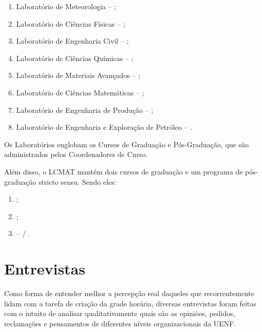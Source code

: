 \begin{enumerate}
  \item Laboratório de Meteorologia – ;
  \item Laboratório de Ciências Físicas – ;
  \item Laboratório de Engenharia Civil – ;
  \item Laboratório de Ciências Químicas – ;
  \item Laboratório de Materiais Avançados – ;
  \item Laboratório de Ciências Matemáticas – ;
  \item Laboratório de Engenharia de Produção – ;
  \item Laboratório de Engenharia e Exploração de Petróleo – .
\end{enumerate}

Os Laboratórios englobam os Cursos de Graduação e Pós-Graduação, que são administrados pelos Coordenadores de Curso.

Além disso, o LCMAT mantém dois cursos de graduação e um programa de pós-graduação stricto sensu. Sendo eles:

\begin{enumerate}
  \item {};
  \item {};
  \item {} –  / .
\end{enumerate}

\section{Entrevistas} \label{sec:entrevistas} %


Como forma de entender melhor a percepção real daqueles que recorrentemente lidam com a tarefa de criação da grade horária, diversas entrevistas foram feitas com o intuito de analisar qualitativamente quais são as opiniões, pedidos, reclamações e pensamentos de diferentes níveis organizacionais da UENF.

